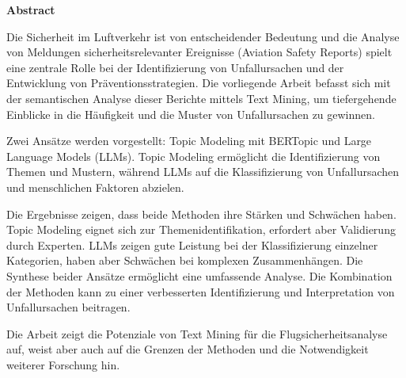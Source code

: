 \label{sec:zusammenfassung}
\begin{center}
\large\bfseries Abstract
\end{center}
\begin{onehalfspace}

Die Sicherheit im Luftverkehr ist von entscheidender Bedeutung und die Analyse von Meldungen sicherheitsrelevanter Ereignisse (Aviation Safety Reports) spielt eine zentrale Rolle bei der Identifizierung von Unfallursachen und der Entwicklung von Präventionsstrategien. Die vorliegende Arbeit befasst sich mit der semantischen Analyse dieser Berichte mittels Text Mining, um tiefergehende Einblicke in die Häufigkeit und die Muster von Unfallursachen zu gewinnen.

Zwei Ansätze werden vorgestellt: Topic Modeling mit BERTopic und Large Language Models (LLMs). Topic Modeling ermöglicht die Identifizierung von Themen und Mustern, während LLMs auf die Klassifizierung von Unfallursachen und menschlichen Faktoren abzielen.

Die Ergebnisse zeigen, dass beide Methoden ihre Stärken und Schwächen haben. Topic Modeling eignet sich zur Themenidentifikation, erfordert aber Validierung durch Experten. LLMs zeigen gute Leistung bei der Klassifizierung einzelner Kategorien, haben aber Schwächen bei komplexen Zusammenhängen. Die Synthese beider Ansätze ermöglicht eine umfassende Analyse. Die Kombination der Methoden kann zu einer verbesserten Identifizierung und Interpretation von Unfallursachen beitragen.

Die Arbeit zeigt die Potenziale von Text Mining für die Flugsicherheitsanalyse auf, weist aber auch auf die Grenzen der Methoden und die Notwendigkeit weiterer Forschung hin.

\end{onehalfspace}

